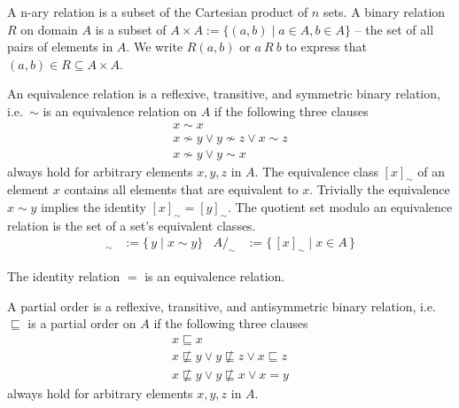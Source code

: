 \begin{definition}
	A n-ary relation is a subset of the Cartesian product of $n$ sets.
	A {\myem binary relation} $R$ on domain $A$ 
	is a subset of $A \times A := \{ (a,b) \mid a\in A, b\in A \}$ -- 
	the set of all pairs of elements in $A$.
	We write $R(a,b)$ or $a\ R\ b$ to express that $(a,b)\in R \subseteq A\times A$.
\end{definition}
\begin{definition}
	An {\myem equivalence relation} 
	is a reflexive, transitive, and symmetric binary relation, 
	i.e.~$\sim$ is an equivalence relation on $A$ if the following three clauses
	\begin{align*}
	x\sim x
	\tag*{reflexivivity}
	\\
	x\not\sim y \lor  y \not\sim z \lor x\sim z
	\tag*{transitivity}
	\\
	x\not\sim y \lor y\sim x
	\tag*{symmetry}
	\end{align*}
	always hold for arbitrary elements $x,y,z$ in $A$.
	The {\myem equivalence class} $[x]_\sim$
	of an element $x$ contains all elements that are equivalent to $x$.
	Trivially the equivalence $x\sim y$ implies the identity $[x]_\sim = [y]_\sim$.
	The quotient set modulo an equivalence relation is the set of a set's equivalent classes.
	\begin{align*} 
	[x]_\sim &:= \{\, y \mid x \sim y\} &
	A/_{\!\sim} &:= \{\, [x]_\sim \mid x \in A \,\} 
	\end{align*} 
\end{definition}

\begin{lemma}
	The identity relation $=$ is an equivalence relation.
\end{lemma}

\begin{definition}
	A {\myem partial order} is a reflexive, transitive, and antisymmetric binary relation, 
	i.e.~$\sqsubseteq$ is a partial order on $A$ if
	the following three clauses
	\begin{align*}
	x\sqsubseteq x
	\tag*{reflexivivity}
	\\
	x\not\sqsubseteq y \lor  y \not\sqsubseteq z \lor x\sqsubseteq z
	\tag*{transitivity}
	\\
	x\not\sqsubseteq y \lor y\not\sqsubseteq x \lor x = y
	\tag*{antisymmetry}
	\end{align*}
	always hold for arbitrary elements $x,y,z$ in $A$.
\end{definition}

